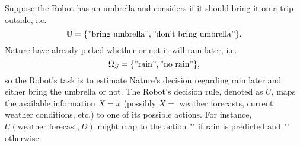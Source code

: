 \begin{example}
	\label{ex:rain}
	Suppose the Robot has an umbrella and considers if it should bring it on a trip outside, i.e.
	\begin{equation}
		\mathbb{U} = \{"\text{bring umbrella}", "\text{don't bring umbrella}"\}.
	\end{equation}
	Nature have already picked whether or not it will rain later, i.e.
	\begin{equation}
		\Omega_S = \{"\text{rain}", "\text{no rain}"\},
	\end{equation}
	so the Robot's task is to estimate Nature's decision regarding rain later and either bring the umbrella or not. The Robot's decision rule, denoted as $U$, maps the available information $X=x$ (possibly $X=$ weather forecasts, current weather conditions, etc.) to one of its possible actions. For instance, $U(\text{weather forecast}, D)$ might map to the action "" if rain is predicted and "" otherwise.
\end{example}

